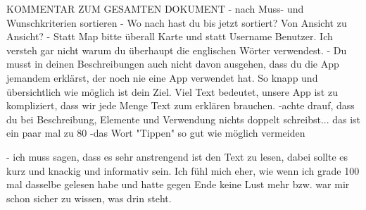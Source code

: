 KOMMENTAR ZUM GESAMTEN DOKUMENT
- nach Muss- und Wunschkriterien sortieren
- Wo nach hast du bis jetzt sortiert? Von Ansicht zu Ansicht?
- Statt Map bitte überall Karte und statt Username Benutzer. Ich versteh gar nicht warum du überhaupt die englischen Wörter verwendest.
- Du musst in deinen Beschreibungen auch nicht davon ausgehen, dass du die App jemandem erklärst, der noch nie eine App verwendet hat. So knapp  und übersichtlich wie möglich ist dein Ziel. Viel Text bedeutet, unsere App ist zu kompliziert, dass wir jede Menge Text zum erklären brauchen. 
-achte drauf, dass du bei Beschreibung, Elemente und Verwendung nichts doppelt schreibst... das ist ein paar mal zu 80%
-das Wort "Tippen" so gut wie möglich vermeiden

- ich muss sagen, dass es sehr anstrengend ist den Text zu lesen, dabei sollte es kurz und knackig und informativ sein. Ich fühl mich eher, wie wenn ich grade 100 mal dasselbe gelesen habe und hatte gegen Ende keine Lust mehr bzw. war mir schon sicher zu wissen, was drin steht.  


